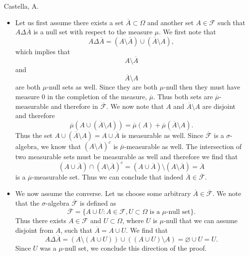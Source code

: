 \begin{solution}[4.7]{Castella, A.}
    \begin{itemize}
        \item Let us first assume there exists a set $\overline{A} \subset \Omega$ and another set $A \in \mathcal{F}$ such that $A\Delta\overline{A}$ is a null set with respect to the measure $\mu$. We first note that 
        $$
            A \Delta \overline{A} = (A\setminus\overline{A}) \cup (\overline{A}\setminus A),
        $$
        which implies that
        $$
            A \setminus \overline{A}
        $$
        and
        $$
            \overline{A} \setminus A
        $$
        are both $\mu$-null sets as well. Since they are both $\mu$-null then they must have measure 0 in the completion of the measure, $\overline{\mu}$. Thus both sets are $\overline{\mu}$-measurable and therefore in $\overline{\mathcal{F}}$. We now note that $A$ and $\overline{A}\setminus A$ are disjoint and therefore
        $$
            \overline{\mu}(A \cup (\overline{A}\setminus A)) = \overline{\mu}(A) + \overline{\mu}(\overline{A}\setminus A).
        $$
        Thus the set $A \cup (\overline{A}\setminus A) = A \cup \overline{A}$ is measurable as well. Since $\overline{\mathcal{F}}$ is a $\sigma$-algebra, we know that $(A\setminus\overline{A})^c$ is $\overline{\mu}$-measurable as well. The intersection of two measurable sets must be measurable as well and therefore we find that
        $$
            (A \cup \overline{A})\cap (A\setminus\overline{A})^c = (A\cup\overline{A})\setminus(A\setminus\overline{A}) = \overline{A}
        $$
        is a $\overline{\mu}$-measurable set. Thus we can conclude that indeed $\overline{A} \in \overline{\mathcal{F}}$.
        \item We now assume the converse. Let us choose some arbitrary $\overline{A} \in \overline{\mathcal{F}}$. We note that the $\sigma$-algebra $\overline{\mathcal{F}}$ is defined as
        $$
            \overline{\mathcal{F}} = \{A \cup U : A \in \mathcal{F}, U\subset\Omega\text{ is a }\mu\text{-null set}\}.
        $$
        Thus there exists $A \in \mathcal{F}$ and $U \subset \Omega$, where $U$ is $\mu$-null that we can assume disjoint from $A$, such that $\overline{A} = A\cup U$. We find that
        $$
            A\Delta\overline{A} = (A\setminus(A\cup U))\cup((A\cup U)\setminus A) = \varnothing\cup U = U.
        $$
        Since $U$ was a $\mu$-null set, we conclude this direction of the proof.
    \end{itemize}
\end{solution}

